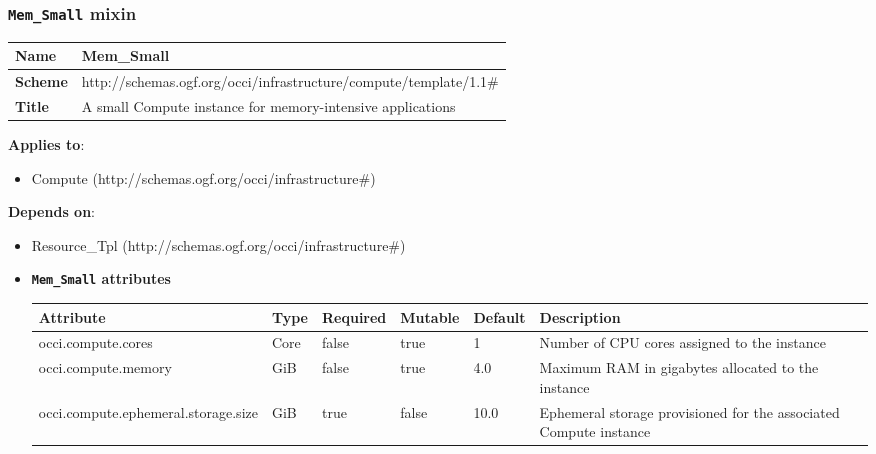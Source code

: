 \subsubsection{\texttt{Mem\_Small} mixin}
\begin{center}
\begin{tabular}{|l|l|}
  \hline
  \textbf{Name} & Mem\_Small \\
  \hline  
  \textbf{Scheme} & http://schemas.ogf.org/occi/infrastructure/compute/template/1.1\# \\
  \hline
  \textbf{Title} & A small Compute instance for memory-intensive applications \\
  \hline
\end{tabular}
\end{center}
\textbf{Applies to}:
\begin{itemize}
	\item Compute (http://schemas.ogf.org/occi/infrastructure\#)
\end{itemize}
\textbf{Depends on}:
\begin{itemize}
	\item Resource\_Tpl (http://schemas.ogf.org/occi/infrastructure\#)
\end{itemize}

\begin{itemize}
\item \textbf{\texttt{Mem\_Small} attributes}

\begin{tabularx}{\textwidth}{|l|l|p{1.4cm}|p{1.3cm}|l|X|}
  \hline
  \textbf{Attribute} & \textbf{Type} & \textbf{Required} & \textbf{Mutable} & \textbf{Default} & \textbf{Description} \\
  \hline  
  occi.compute.cores & Core & false & true & 1 & Number of CPU cores assigned to the instance \\
  \hline
  occi.compute.memory & GiB & false & true & 4.0 & Maximum RAM in gigabytes allocated to the instance \\
  \hline
  occi.compute.ephemeral.storage.size & GiB & true & false & 10.0 & Ephemeral storage provisioned for the associated Compute instance \\
  \hline
\end{tabularx}
\end{itemize}


